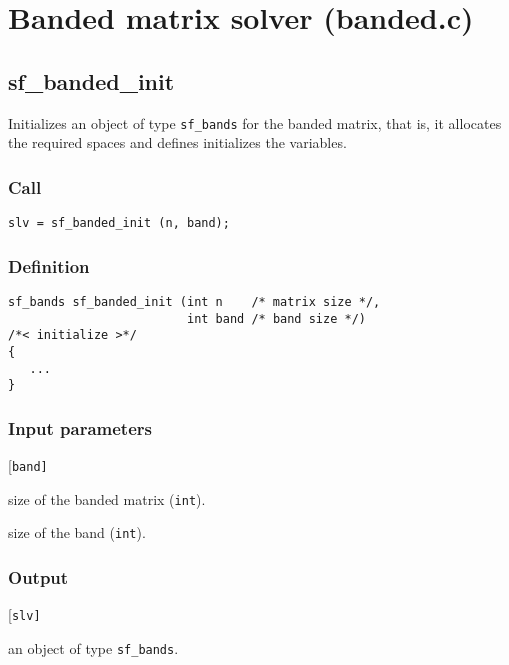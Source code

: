 \section{Banded matrix solver (banded.c)}\label{sec:banded.c}




\subsection{{sf\_banded\_init}}
Initializes an object of type \texttt{sf\_bands} for the banded matrix, that is, it allocates the required spaces and defines initializes the variables.


\subsubsection*{Call}
\begin{verbatim}slv = sf_banded_init (n, band);\end{verbatim}

\subsubsection*{Definition}
\begin{verbatim}
sf_bands sf_banded_init (int n    /* matrix size */, 
                         int band /* band size */)
/*< initialize >*/
{
   ...
}
\end{verbatim}

\subsubsection*{Input parameters}
\begin{desclist}{\tt }{\quad}[\tt band]
   \setlength\itemsep{0pt}
   \item[n]    size of the banded matrix (\texttt{int}). 
   \item[band] size of the band (\texttt{int}).  
\end{desclist}

\subsubsection*{Output}
\begin{desclist}{\tt }{\quad}[\tt slv]
   \setlength\itemsep{0pt}
   \item[slv] an object of type \texttt{sf\_bands}.
\end{desclist}




